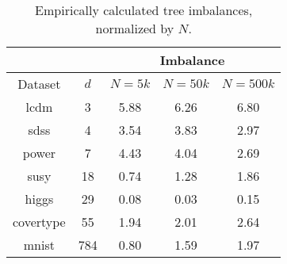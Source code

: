 \begin{table}[tb]
\begin{center}
\begin{tabular}{| c | c | c | c | c |}
\hline
 & & \multicolumn{3}{|c|}{Imbalance} \\
\hline
Dataset & $d$ & $N = 5k$ & $N = 50k$ & $N = 500k$ \\
\hline
lcdm & 3 & 5.88 & 6.26 & 6.80 \\
sdss & 4 & 3.54 & 3.83 & 2.97 \\
power & 7 & 4.43 & 4.04 & 2.69 \\
susy & 18 & 0.74 & 1.28 & 1.86 \\
higgs & 29 & 0.08 & 0.03 & 0.15 \\
covertype & 55 & 1.94 & 2.01 & 2.64 \\
mnist & 784 & 0.80 & 1.59 & 1.97 \\
\hline
\end{tabular}
\end{center}
\caption{Empirically calculated tree imbalances, normalized by $N$.}
\label{tab:imbalance}
\end{table}



